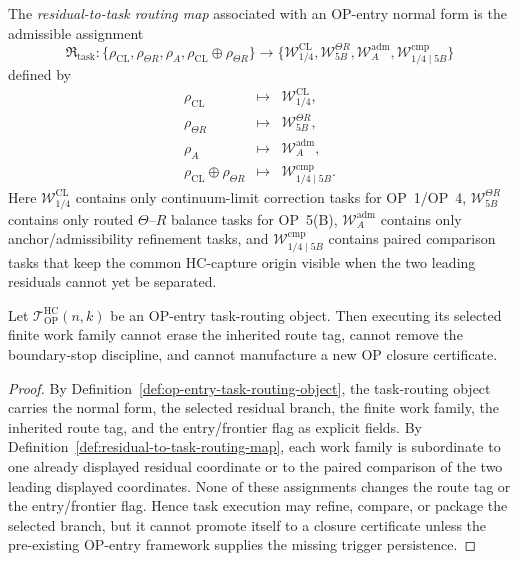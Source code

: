 \begin{definition}
\label{def:residual-to-task-routing-map}
The \emph{residual-to-task routing map} associated with an OP-entry normal form is the admissible assignment
\[
  \mathfrak R_{\mathrm{task}}
  :
  \{\rho_{\mathrm{CL}},\rho_{\Theta R},\rho_A,
      \rho_{\mathrm{CL}}\oplus\rho_{\Theta R}\}
  \longrightarrow
  \{\mathcal W_{1/4}^{\mathrm{CL}},
    \mathcal W_{5B}^{\Theta R},
    \mathcal W_A^{\mathrm{adm}},
    \mathcal W_{1/4\mid 5B}^{\mathrm{cmp}}
  \}
\]
defined by
\[
\begin{array}{rcl}
  \rho_{\mathrm{CL}} &\longmapsto&
  \mathcal W_{1/4}^{\mathrm{CL}},\\[0.25em]
  \rho_{\Theta R} &\longmapsto&
  \mathcal W_{5B}^{\Theta R},\\[0.25em]
  \rho_A &\longmapsto&
  \mathcal W_A^{\mathrm{adm}},\\[0.25em]
  \rho_{\mathrm{CL}}\oplus\rho_{\Theta R} &\longmapsto&
  \mathcal W_{1/4\mid 5B}^{\mathrm{cmp}}.
\end{array}
\]
Here $\mathcal W_{1/4}^{\mathrm{CL}}$ contains only continuum-limit correction tasks for OP~1/OP~4, $\mathcal W_{5B}^{\Theta R}$ contains only routed $\Theta$--$R$ balance tasks for OP~5(B), $\mathcal W_A^{\mathrm{adm}}$ contains only anchor/admissibility refinement tasks, and $\mathcal W_{1/4\mid 5B}^{\mathrm{cmp}}$ contains paired comparison tasks that keep the common HC-capture origin visible when the two leading residuals cannot yet be separated.
\end{definition}

\begin{lemma}
\label{lem:task-routing-preserves-op-entry-normal-form-discipline}
Let $\mathcal T_{\mathrm{OP}}^{\mathrm{HC}}(n,k)$ be an OP-entry task-routing object.  Then executing its selected finite work family cannot erase the inherited route tag, cannot remove the boundary-stop discipline, and cannot manufacture a new OP closure certificate.
\end{lemma}

\begin{proof}
By Definition~\ref{def:op-entry-task-routing-object}, the task-routing object carries the normal form, the selected residual branch, the finite work family, the inherited route tag, and the entry/frontier flag as explicit fields.  By Definition~\ref{def:residual-to-task-routing-map}, each work family is subordinate to one already displayed residual coordinate or to the paired comparison of the two leading displayed coordinates.  None of these assignments changes the route tag or the entry/frontier flag.  Hence task execution may refine, compare, or package the selected branch, but it cannot promote itself to a closure certificate unless the pre-existing OP-entry framework supplies the missing trigger persistence.
\end{proof}

